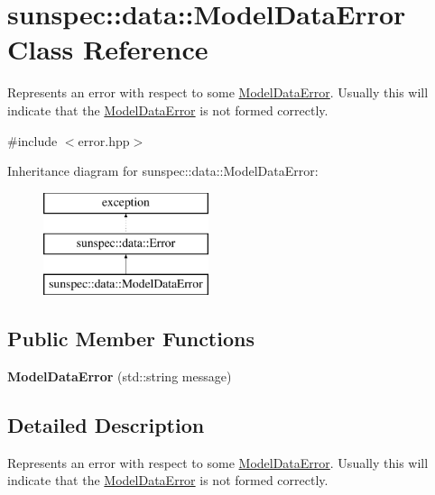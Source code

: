 \hypertarget{classsunspec_1_1data_1_1_model_data_error}{}\section{sunspec\+:\+:data\+:\+:Model\+Data\+Error Class Reference}
\label{classsunspec_1_1data_1_1_model_data_error}


Represents an error with respect to some \hyperlink{classsunspec_1_1data_1_1_model_data_error}{Model\+Data\+Error}. Usually this will indicate that the \hyperlink{classsunspec_1_1data_1_1_model_data_error}{Model\+Data\+Error} is not formed correctly.  




{\ttfamily \#include $<$error.\+hpp$>$}

Inheritance diagram for sunspec\+:\+:data\+:\+:Model\+Data\+Error\+:\begin{figure}[H]
\begin{center}
\leavevmode
\includegraphics[height=3.000000cm]{classsunspec_1_1data_1_1_model_data_error}
\end{center}
\end{figure}
\subsection*{Public Member Functions}
\begin{DoxyCompactItemize}
\item 
\mbox{\label{classsunspec_1_1data_1_1_model_data_error_a9360c3bd8677ab966c59408bd9c70417}} 
{\bfseries Model\+Data\+Error} (std\+::string message)
\end{DoxyCompactItemize}


\subsection{Detailed Description}
Represents an error with respect to some \hyperlink{classsunspec_1_1data_1_1_model_data_error}{Model\+Data\+Error}. Usually this will indicate that the \hyperlink{classsunspec_1_1data_1_1_model_data_error}{Model\+Data\+Error} is not formed correctly. 

